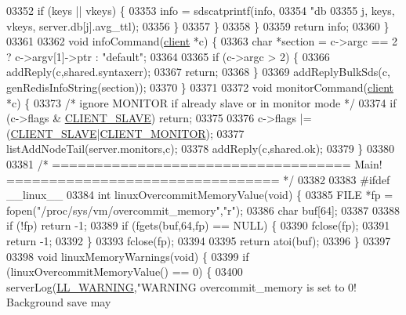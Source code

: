 \begin{DoxyCode}
{{{{{{{{{{{{{{{{{{{{{{{{{{{{{{{{{{{{{{{{{{{{{{{{{{{{{{{{{{{{{{{{{{{{{{{{{{{{{{{{{{{{{{{{{{{{{{{{{{{{{{{{{{{{{{{{{{{{{{{{{{{{{{{{{{{{{{{{{{{{{{{{{{{{{{{{{{{{{{{{{{{{{{{{03352             \textcolor{keywordflow}{if} (keys || vkeys) \{
03353                 info = sdscatprintf(info,
03354                     \textcolor{stringliteral}{"db%
03355                     j, keys, vkeys, server.db[j].avg\_ttl);
03356             \}
03357         \}
03358     \}
03359     \textcolor{keywordflow}{return} info;
03360 \}
03361 
03362 \textcolor{keywordtype}{void} infoCommand(\hyperlink{structclient}{client} *c) \{
03363     \textcolor{keywordtype}{char} *section = c->argc == 2 ? c->argv[1]->ptr : \textcolor{stringliteral}{"default"};
03364 
03365     \textcolor{keywordflow}{if} (c->argc > 2) \{
03366         addReply(c,shared.syntaxerr);
03367         \textcolor{keywordflow}{return};
03368     \}
03369     addReplyBulkSds(c, genRedisInfoString(section));
03370 \}
03371 
03372 \textcolor{keywordtype}{void} monitorCommand(\hyperlink{structclient}{client} *c) \{
03373     \textcolor{comment}{/* ignore MONITOR if already slave or in monitor mode */}
03374     \textcolor{keywordflow}{if} (c->flags & \hyperlink{server_8h_ae9f6995948253652bc9454d79a72f4a7}{CLIENT\_SLAVE}) \textcolor{keywordflow}{return};
03375 
03376     c->flags |= (\hyperlink{server_8h_ae9f6995948253652bc9454d79a72f4a7}{CLIENT\_SLAVE}|\hyperlink{server_8h_a7724350e4f0ddbf1c80740699fac78be}{CLIENT\_MONITOR});
03377     listAddNodeTail(server.monitors,c);
03378     addReply(c,shared.ok);
03379 \}
03380 
03381 \textcolor{comment}{/* =================================== Main! ================================ */}
03382 
03383 \textcolor{preprocessor}{#}\textcolor{preprocessor}{ifdef} \_\_linux\_\_
03384 \textcolor{keywordtype}{int} linuxOvercommitMemoryValue(\textcolor{keywordtype}{void}) \{
03385     FILE *fp = fopen(\textcolor{stringliteral}{"/proc/sys/vm/overcommit\_memory"},\textcolor{stringliteral}{"r"});
03386     \textcolor{keywordtype}{char} buf[64];
03387 
03388     \textcolor{keywordflow}{if} (!fp) \textcolor{keywordflow}{return} -1;
03389     \textcolor{keywordflow}{if} (fgets(buf,64,fp) == NULL) \{
03390         fclose(fp);
03391         \textcolor{keywordflow}{return} -1;
03392     \}
03393     fclose(fp);
03394 
03395     \textcolor{keywordflow}{return} atoi(buf);
03396 \}
03397 
03398 \textcolor{keywordtype}{void} linuxMemoryWarnings(\textcolor{keywordtype}{void}) \{
03399     \textcolor{keywordflow}{if} (linuxOvercommitMemoryValue() == 0) \{
03400         serverLog(\hyperlink{server_8h_a31229b9334bba7d6be2a72970967a14b}{LL\_WARNING},\textcolor{stringliteral}{"WARNING overcommit\_memory is set to 0! Background save may
}}}}}}}}}}}}}}}}}}}}}}}}}}}}}}}}}}}}}}}}}}}}}}}}}}}}}}}}}}}}}}}}}}}}}}}}}}}}}}}}}}}}}}}}}}}}}}}}}}}}}}}}}}}}}}}}}}}}}}}}}}}}}}}}}}}}}}}}}}}}}}}}}}}}}}}}}}}}}}}}}}}}}}}}}}
\end{DoxyCode}
